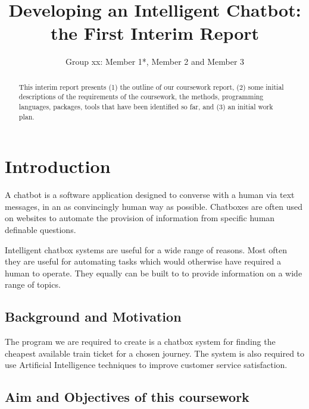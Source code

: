 \documentclass[11pt]{cmpreport}
\title{Developing an Intelligent Chatbot: the First Interim Report}
\author{Group xx: Member 1*, Member 2 and Member 3}
\begin{document}
\maketitle

\begin{abstract}
	This interim report presents (1) the outline of our coursework report, (2) some initial descriptions of the requirements of the coursework, the methods, programming languages, packages, tools that have been identified so far, and (3) an initial work plan.      

\end{abstract}

\section{Introduction}


A chatbot is a software application designed to converse with a human via text messages, in an as convincingly human way as possible. Chatboxes are often used on websites to automate the provision of information from specific human definable questions.

Intelligent chatbox systems are useful for a wide range of reasons. Most often they are useful for automating tasks which would otherwise have required a human to operate. They equally can be built to to provide information on a wide range of topics.

\subsection{Background and Motivation}

The program we are required to create is a chatbox system for finding the cheapest available train ticket for a chosen journey. The system is also required to use Artificial Intelligence techniques to improve customer service satisfaction. 

\subsection{Aim and Objectives of this coursework} 
\end{document}
